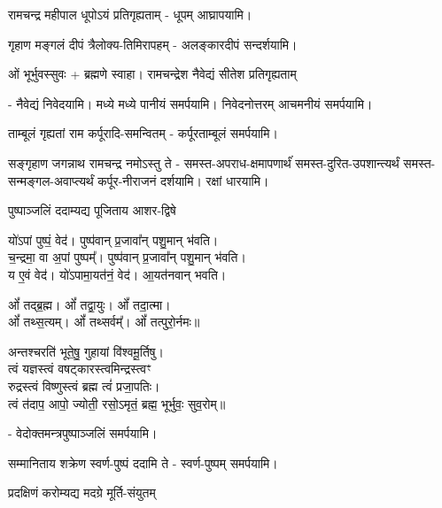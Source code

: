 \renewcommand{\devAya}{श्री-सीता-लक्ष्मण-भरत-शत्रुघ्न-हनुमत्-समेत-श्री-रामचन्द्र-परब्रह्मणे नमः}



{रामचन्द्र महीपाल धूपोऽयं प्रतिगृह्यताम्}
\namah - धूपम् आघ्रापयामि।

{गृहाण मङ्गलं दीपं त्रैलोक्य-तिमिरापहम्}
\namah - अलङ्कारदीपं सन्दर्शयामि।

ओं भूर्भुवस्सुवः + ब्रह्मणे स्वाहा।
{रामचन्द्रेश नैवेद्यं सीतेश प्रतिगृह्यताम्}

\namah - नैवेद्यं निवेदयामि। मध्ये मध्ये पानीयं समर्पयामि। निवेदनोत्तरम् आचमनीयं समर्पयामि।

{ताम्बूलं गृह्यतां राम कर्पूरादि-समन्वितम्}
\namah - कर्पूरताम्बूलं समर्पयामि।

{सङ्गृहाण जगन्नाथ रामचन्द्र नमोऽस्तु ते}
\namah - समस्त-अपराध-क्षमापणार्थंं समस्त-दुरित-उपशान्त्यर्थं समस्त-सन्मङ्गल-अवाप्त्यर्थं कर्पूर-नीराजनं दर्शयामि। रक्षां धारयामि।


{पुष्पाञ्जलिं ददाम्यद्य पूजिताय आशर-द्विषे}

यो॑ऽपां पुष्पं॒ वेद॑। पुष्प॑वान् प्र॒जावा᳚न् पशु॒मान् भ॑वति।\\
च॒न्द्रमा॒ वा अ॒पां पुष्पम्᳚। पुष्प॑वान् प्र॒जावा᳚न् पशु॒मान् भ॑वति।\\
य ए॒वं वेद॑। यो॑ऽपामा॒यत॑नं॒ वेद॑। आ॒यत॑नवान् भवति।\medskip

ओं᳚ तद्ब्र॒ह्म। ओं᳚ तद्वा॒युः। ओं᳚ तदा॒त्मा।\\ ओं᳚ तथ्स॒त्यम्‌।
ओं᳚ तथ्सर्वम्᳚‌। ओं᳚ तत्पुरो॒र्नमः॥\medskip

अन्तश्चरति॑ भूते॒षु॒ गुहायां वि॑श्वमू॒र्तिषु। \\
त्वं यज्ञस्त्वं वषट्कारस्त्वमिन्द्रस्त्वꣳ\\ रुद्रस्त्वं विष्णुस्त्वं ब्रह्म त्वं॑ प्रजा॒पतिः। \\
त्वं त॑दाप॒ आपो॒ ज्योती॒ रसो॒ऽमृतं॒ ब्रह्म॒ भूर्भुवः॒ सुव॒रोम्‌॥

\namah - वेदोक्तमन्त्रपुष्पाञ्जलिं समर्पयामि।

{सम्मानिताय शक्रेण स्वर्ण-पुष्पं ददामि ते}
\namah - स्वर्ण-पुष्पम् समर्पयामि।

{प्रदक्षिणं करोम्यद्य मदग्रे मूर्ति-संयुतम्}

